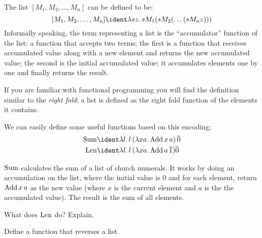 \documentclass[../../../include/open-logic-section]{subfiles}
\begin{document}

The list $[M_1, M_2, \ldots, M_n]$ can be defined to be:
\[
  [M_1, M_2, \ldots, M_n] \ident \lambd[sz][s M_1 (s M_2 (\ldots (s M_n z)))]
\]
Informally speaking, the term representing a list is the
``accumulator'' function of the list: a function that accepts two
terms; the first is a function that receives accumulated value along
with a new element and returns the new accumulated value; the second
is the initial accumulated value; it accumulates elements one by one
and finally returns the result.

\begin{digress}
  If you are familiar with functional programming you will find the
  definition similar to the \emph{right fold}: a list is defined as
  the right fold function of the elements it contains.
\end{digress}

We can easily define some useful functions based on this encoding; 
\begin{align*}
  \fn{Sum} & \ident
  \lambd[l][l \, (\lambd[xa][\fn{Add} \, x \, a])\,  \num{0}]\\
  \fn{Len} & \ident
  \lambd[l][l \, (\lambd[xa][\fn{Add} \, a \, \num{1}]) \num{0}]
\end{align*}

$\mathrm{Sum}$ calculates the sum of a list of church numerals. It works
by doing an accumulation on the list, where the initial value is
$\num{0}$ and for each element, return $\mathrm{Add} \, x\, a$ as the new
value (where $x$ is the current element and $a$ is the the accumulated
value). The result is the sum of all elements.

\begin{prob}
  What does $\mathrm{Len}$ do? Explain.
\end{prob}

\begin{prob}
  Define a function that reverses a list.
\end{prob}
\end{document}
